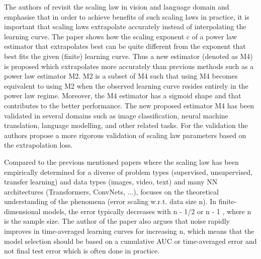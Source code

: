 \documentclass{article} %
\begin{document}
The authors of \cite{alabdulmohsin2022revisiting} revisit the scaling law in vision and language domain and emphasise that in order to achieve benefits of such scaling laws in practice, it is important that scaling laws extrapolate accurately instead of interpolating the learning curve. The paper shows how the scaling exponent c of a power law estimator that extrapolates best can be quite different from the exponent that best fits the given (finite) learning curve. Thus a new estimator (denoted as M4) is proposed which extrapolates more accurately than previous methods such as a power law estimator M2. M2 is a subset of M4 such that using M4 becomes equivalent to using M2 when the observed learning curve resides entirely in the power law regime. Moreover, the M4 estimator has a sigmoid shape and that contributes to the better performance. The new proposed estimator M4 has been validated in several domains such as image classification, neural machine translation, language modelling, and other related tasks. For the validation the authors propose a more rigorous validation of scaling law parameters based on the extrapolation loss.

Compared to the previous mentioned papers where the scaling law has been empirically determined for a diverse of problem types (supervised, unsupervised, transfer learning) and data types (images, video, text) and many NN architectures (Transformers, ConvNets, ...), \cite{hutter2021learning} focuses on the theoretical understanding of the phenomena (error scaling w.r.t. data size n). In finite-dimensional models, the error typically decreases with n - 1/2 or n - 1 , where n is the sample size. The author of the paper also argues that noise rapidly improves in time-averaged learning curves for increasing n, which means that the model selection should be based on a cumulative AUC or time-averaged error and not final test error which is often done in practice.


\end{document}
